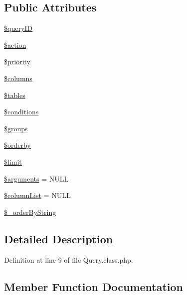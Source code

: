 \subsection*{Public Attributes}
\begin{DoxyCompactItemize}
\item 
\hyperlink{classQuery_a67666b2fcd6c60e73d8329f7d22044dc}{\$query\+ID}
\item 
\hyperlink{classQuery_a62c36010085369fc0508ea548660be9f}{\$action}
\item 
\hyperlink{classQuery_a4d64f61fd525a70ebc2aaa6ab8291e20}{\$priority}
\item 
\hyperlink{classQuery_a7cf97254cbd55fdbb9e149723498d9ba}{\$columns}
\item 
\hyperlink{classQuery_a5c74163d1615b141456b123c11fa9d92}{\$tables}
\item 
\hyperlink{classQuery_a5c71d786a82b2cc014968d2553b6bc9d}{\$conditions}
\item 
\hyperlink{classQuery_a76992fbfae6d700e65dfde28911a2475}{\$groups}
\item 
\hyperlink{classQuery_aa955216a83dfe57cdd9600b44b38ebac}{\$orderby}
\item 
\hyperlink{classQuery_abe481cf8b7f42b513a4f64cf7fb0ffea}{\$limit}
\item 
\hyperlink{classQuery_a49166e3c5f5198e4b899c8ee47b6258a}{\$arguments} = N\+U\+LL
\item 
\hyperlink{classQuery_a113bcdfdc3bf6acef684a06ae324334a}{\$column\+List} = N\+U\+LL
\item 
\hyperlink{classQuery_aaf035e5cfac7afe46163a6ba4c55c34b}{\$\+\_\+order\+By\+String}
\end{DoxyCompactItemize}


\subsection{Detailed Description}


Definition at line 9 of file Query.\+class.\+php.



\subsection{Member Function Documentation}
